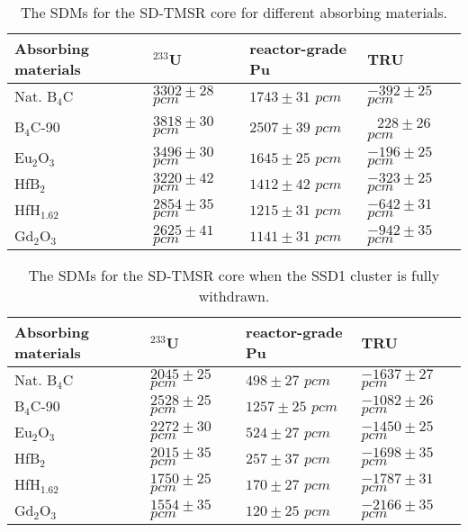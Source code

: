 \begin{table}  %
	\caption{The SDMs for the SD-TMSR core for different absorbing materials.}
	\vspace{0.1in}
	\begin{tabularx}{\textwidth}{p{2.5cm} p{2.5cm} p{2.5cm} p{3cm}}
		\hline
		Absorbing materials        				&  $^{233}$U & reactor-grade Pu&  TRU \\
		\hline
		Nat. B$_4$C					& $3302\pm28$ $pcm$ &$1743\pm31$ $pcm$  &$-392\pm25$ $pcm$ \\
		B$_4$C-90                   & $3818\pm30$ $pcm$ & $2507\pm39$ $pcm$ & $ $ $ $ $228\pm26$ $pcm$ \\
		Eu$_2$O$_3$                 &  $3496\pm30$ $pcm$&  $1645\pm25$ $pcm$&$-196\pm25$ $pcm$\\
		HfB$_2$        				&$3220\pm42$ $pcm$  &$1412\pm42$ $pcm$  &$-323\pm25$ $pcm$   \\
		HfH$_{1.62}$				& $2854\pm35$ $pcm$ &$1215\pm31$ $pcm$  &$-642\pm31$ $pcm$\\
		Gd$_2$O$_3$	  		        & $2625\pm41$ $pcm$ &$1141\pm31$ $pcm$  & $-942\pm35$ $pcm$\\
		\hline
	\end{tabularx}
	\label{tab:table2}
\end{table}
\begin{table}  %
	\caption{The SDMs for the SD-TMSR core when the SSD1 cluster is fully withdrawn.}
	\vspace{0.1in}
	\begin{tabularx}{\textwidth}{p{2.5cm} p{2.5cm} p{2.5cm} p{3cm}}
		\hline
		Absorbing materials         &  $^{233}$U        & reactor-grade Pu  &  TRU \\
		\hline
		Nat. B$_4$C					& $2045\pm25$ $pcm$ &$498\pm27$ $pcm$   & $-1637\pm27$ $pcm$ \\
		B$_4$C-90                   & $2528\pm25$ $pcm$ & $1257\pm25$ $pcm$ &  $-1082\pm26$ $pcm$ \\
		Eu$_2$O$_3$                 &  $2272\pm30$ $pcm$&  $524\pm27$ $pcm$ &$-1450\pm25$ $pcm$\\
		HfB$_2$        				&$2015\pm35$ $pcm$  &$257\pm37$ $pcm$   &$-1698\pm35$ $pcm$   \\
		HfH$_{1.62}$				& $1750\pm25$ $pcm$ &$170\pm27$ $pcm$   &$-1787\pm31$ $pcm$\\
		Gd$_2$O$_3$	  		        & $1554\pm35$ $pcm$ &$120\pm25$ $pcm$    & $-2166\pm35$ $pcm$\\
		\hline
	\end{tabularx}
	\label{tab:table50}
\end{table}

